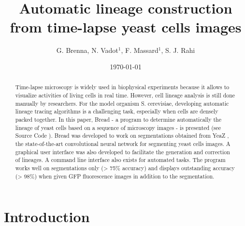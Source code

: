 \documentclass{TP}
\begin{document}
\title{Automatic lineage construction from time-lapse yeast cells images}
\author{G. Brenna\footnotemark, N. Vadot$^1$, F. Massard$^1$, S. J. Rahi\\}
\date{\today}

\pagestyle{plain}


\begin{abstract}

Time-lapse microscopy is widely used in biophysical experiments because it allows to visualize activities of living cells in real time. However, cell lineage analysis is still done manually by researchers. For the model organism S. cerevisiae, developing automatic lineage tracing algorithms is a challenging task, especially when cells are densely packed together. In this paper, Bread - a program to determine automatically the lineage of yeast cells based on a sequence of microscopy images - is presented (see Source Code \cite{lien github}). Bread was developed to work on segmentations obtained from YeaZ \cite{yeaz}, the state-of-the-art convolutional neural network for segmenting yeast cells images. A graphical user interface was also developed to facilitate the generation and correction of lineages. A command line interface also exists for automated tasks. The program works well on segmentations only (> 75\% accuracy) and displays outstanding accuracy (> 98\%) when given GFP fluorescence images in addition to the segmentation.
 
\end{abstract}

\maketitle


\section{Introduction}
\end{document}
